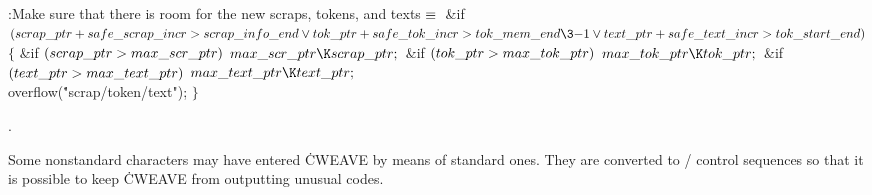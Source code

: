 \B{}:Make sure that there is room for the new scraps, tokens, and
texts\X${}\equiv{}$\6
\&{if} ${}(\\{scrap\_ptr}+\\{safe\_scrap\_incr}>\\{scrap\_info\_end}\V\\{tok%
\_ptr}+\\{safe\_tok\_incr}>\\{tok\_mem\_end}\3{-1}\V\\{text\_ptr}+\\{safe\_text%
\_incr}>\\{tok\_start\_end}){}$\5
${}\{{}$\1\6
\&{if} ${}(\\{scrap\_ptr}>\\{max\_scr\_ptr}){}$\1\5
${}\\{max\_scr\_ptr}\K\\{scrap\_ptr};{}$\2\6
\&{if} ${}(\\{tok\_ptr}>\\{max\_tok\_ptr}){}$\1\5
${}\\{max\_tok\_ptr}\K\\{tok\_ptr};{}$\2\6
\&{if} ${}(\\{text\_ptr}>\\{max\_text\_ptr}){}$\1\5
${}\\{max\_text\_ptr}\K\\{text\_ptr};{}$\2\6
\\{overflow}(\.{"scrap/token/text"});\6
\4${}\}{}$\2\par
{}.\fi

Some nonstandard characters may have entered \.{CWEAVE} by means of
standard ones. They are converted to \TEX/ control sequences so that it is
possible to keep \.{CWEAVE} from outputting unusual  codes.

